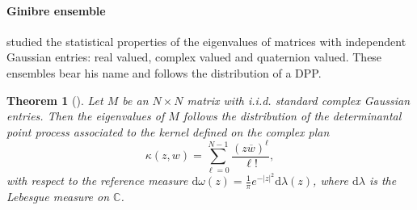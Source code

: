 \documentclass[twoside,11pt]{book}
\newtheorem{theorem}{Theorem}
\numberwithin{theorem}{chapter}
\numberwithin{definition}{chapter}
\numberwithin{proposition}{chapter}
\numberwithin{corollary}{chapter}
\numberwithin{example}{chapter}
\numberwithin{lemma}{chapter}
\numberwithin{assumption}{chapter}
\begin{document}
 









\paragraph{Ginibre ensemble}
\cite{Gin65} studied the statistical properties of the eigenvalues of matrices with independent Gaussian entries: real valued, complex valued and quaternion valued. These ensembles bear his name and follows the distribution of a DPP.
\begin{theorem}[\cite{Gin65}]
Let $M$ be an $N\times N$ matrix with i.i.d. standard complex Gaussian entries.
Then the eigenvalues of $M$ follows the distribution of the determinantal point
process associated to the kernel defined on the complex plan
\begin{equation}
\kappa(z,w) = \sum\limits_{\ell =0}^{N-1} \frac{(z \overline{w})^{\ell}}{\ell!},
\end{equation}
with respect to the reference measure $\mathrm{d}\omega(z) = \frac{1}{\pi}e^{-|z|^{2}} \mathrm{d}\lambda(z)$, where $\mathrm{d}\lambda$ is the Lebesgue measure on $\mathbb{C}$.
\end{theorem}
\end{document}
